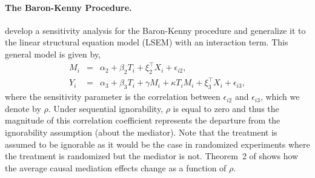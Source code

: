 \documentclass[11pt,letterpaper]{article}
\theoremstyle{plain}
\begin{document}
\paragraph{The Baron-Kenny Procedure.}

\citet{imai:keel:yama:10} develop a sensitivity analysis for the
Baron-Kenny procedure and \citet{imai:keel:ting:10} generalize it to
the linear structural equation model (LSEM) with an interaction term.
This general model is given by,
\begin{eqnarray}
  M_i & = & \alpha_2 + \beta_2 T_i + \xi_2^\top X_i + \epsilon_{i2}, \label{eq:MgivenTX} \\
  Y_i & = & \alpha_3 + \beta_3 T_i + \gamma M_i + \kappa T_i M_i + \xi_3^\top X_i + \epsilon_{i3}, \label{eq:YgivenTMX}
\end{eqnarray}
where the sensitivity parameter is the correlation between
$\epsilon_{i2}$ and $\epsilon_{i3}$, which we denote by $\rho$.  Under
sequential ignorability, $\rho$ is equal to zero and thus the
magnitude of this correlation coefficient represents the departure
from the ignorability assumption (about the mediator).  Note that the
treatment is assumed to be ignorable as it would be the case in
randomized experiments where the treatment is randomized but the
mediator is not.  Theorem~2 of \citet{imai:keel:ting:10} shows how the
average causal mediation effects change as a function of $\rho$.
\end{document}
